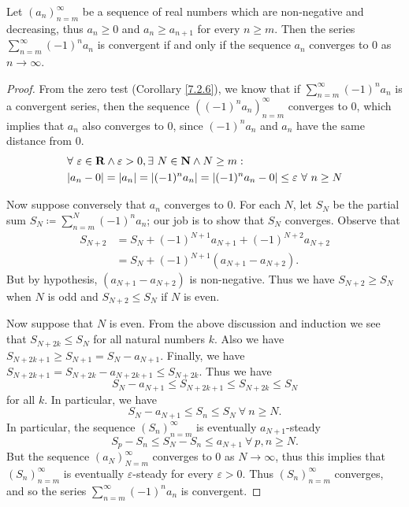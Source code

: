 \begin{proposition}\label{7.2.12}
    Let \((a_n)_{n = m}^\infty\) be a sequence of real numbers which are non-negative and decreasing, thus \(a_n \geq 0\) and \(a_n \geq a_{n + 1}\) for every \(n \geq m\).
    Then the series \(\sum_{n = m}^\infty (-1)^n a_n\) is convergent if and only if the sequence \(a_n\) converges to \(0\) as \(n \to \infty\).
\end{proposition}

\begin{proof}
    From the zero test (Corollary \ref{7.2.6}), we know that if \(\sum_{n = m}^\infty (-1)^n a_n\) is a convergent series, then the sequence \(((-1)^n a_n)_{n = m}^\infty\) converges to \(0\), which implies that \(a_n\) also converges to \(0\), since \((-1)^n a_n\) and \(a_n\) have the same distance from \(0\).
    \begin{align*}
         & \forall\ \varepsilon \in \mathbf{R} \land \varepsilon > 0, \exists\ N \in \mathbf{N} \land N \geq m :        \\
         & \abs*{a_n - 0} = \abs*{a_n} = \abs*{(-1)^n a_n} = \abs*{(-1)^n a_n - 0} \leq \varepsilon \ \forall\ n \geq N
    \end{align*}

    Now suppose conversely that \(a_n\) converges to \(0\).
    For each \(N\), let \(S_N\) be the partial sum \(S_N \coloneqq \sum_{n = m}^N (-1)^n a_n\);
    our job is to show that \(S_N\) converges.
    Observe that
    \begin{align*}
        S_{N + 2} & = S_N + (-1)^{N + 1} a_{N + 1} + (-1)^{N + 2} a_{N + 2} \\
                  & = S_N + (-1)^{N + 1} (a_{N + 1} - a_{N + 2}).
    \end{align*}
    But by hypothesis, \((a_{N + 1} - a_{N + 2})\) is non-negative.
    Thus we have \(S_{N + 2} \geq S_N\) when \(N\) is odd and \(S_{N + 2} \leq S_N\) if \(N\) is even.

    Now suppose that \(N\) is even.
    From the above discussion and induction we see that \(S_{N + 2k} \leq S_N\) for all natural numbers \(k\).
    Also we have \(S_{N + 2k + 1} \geq S_{N + 1} = S_N - a_{N + 1}\).
    Finally, we have \(S_{N + 2k + 1} = S_{N + 2k} - a_{N + 2k + 1} \leq S_{N + 2k}\).
    Thus we have
    \[
        S_N - a_{N + 1} \leq S_{N + 2k + 1} \leq S_{N + 2k} \leq S_N
    \]
    for all \(k\).
    In particular, we have
    \[
        S_N - a_{N + 1} \leq S_n \leq S_N \ \forall\ n \geq N.
    \]
    In particular, the sequence \((S_n)_{n = m}^\infty\) is eventually \(a_{N + 1}\)-steady
    \[
        S_p - S_n \leq S_N - S_n \leq a_{N + 1} \ \forall\ p, n \geq N.
    \]
    But the sequence \((a_N)_{N = m}^\infty\) converges to \(0\) as \(N \to \infty\), thus this implies that \((S_n)_{n = m}^\infty\) is eventually \(\varepsilon\)-steady for every \(\varepsilon > 0\).
    Thus \((S_n)_{n = m}^\infty\) converges, and so the series \(\sum_{n = m}^\infty (-1)^n a_n\) is convergent.
\end{proof}

